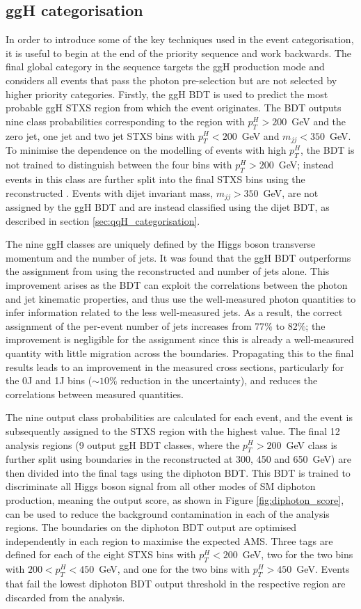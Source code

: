 \FloatBarrier
\newpage
\subsection{ggH categorisation}
In order to introduce some of the key techniques used in the event categorisation, it is useful to begin at the end of the priority sequence and work backwards. The final global category in the sequence targets the ggH production mode and considers all events that pass the photon pre-selection but are not selected by higher priority categories. Firstly, the ggH BDT is used to predict the most probable ggH STXS region from which the event originates. The BDT outputs nine class probabilities corresponding to the region with $p_T^H>200$~GeV and the zero jet, one jet and two jet STXS bins with $p_T^H<200$~GeV and $m_{jj}<350$~GeV. To minimise the dependence on the modelling of events with high $p_T^H$, the BDT is not trained to distinguish between the four bins with $p_T^H>200$~GeV; instead events in this class are further split into the final STXS bins using the reconstructed \ptgg. Events with dijet invariant mass, $m_{jj}>350$~GeV, are not assigned by the ggH BDT and are instead classified using the dijet BDT, as described in section \ref{sec:qqH_categorisation}.

The nine ggH classes are uniquely defined by the Higgs boson transverse momentum and the number of jets. It was found that the ggH BDT outperforms the assignment from using the reconstructed \ptgg and number of jets alone. This improvement arises as the BDT can exploit the correlations between the photon and jet kinematic properties, and thus use the well-measured photon quantities to infer information related to the less well-measured jets. As a result, the correct assignment of the per-event number of jets increases from 77\% to 82\%; the improvement is negligible for the \ptgg assignment since this is already a well-measured quantity with little migration across the \ptH boundaries. Propagating this to the final results leads to an improvement in the measured cross sections, particularly for the 0J and 1J bins ($\sim 10\%$ reduction in the uncertainty), and reduces the correlations between measured quantities.

The nine output class probabilities are calculated for each event, and the event is subsequently assigned to the STXS region with the highest value. The final 12 analysis regions (9 output ggH BDT classes, where the $p_T^H>200$~GeV class is further split using boundaries in the reconstructed \ptgg at 300, 450 and 650~GeV) are then divided into the final tags using the diphoton BDT. This BDT is trained to discriminate all Higgs boson signal from all other modes of SM diphoton production, meaning the output score, as shown in Figure \ref{fig:diphoton_score}, can be used to reduce the background contamination in each of the analysis regions. The boundaries on the diphoton BDT output are optimised independently in each region to maximise the expected AMS. Three tags are defined for each of the eight STXS bins with $p_T^H<200$~GeV, two for the two bins with ${200<p_T^H<450}$~GeV, and one for the two bins with $p_T^H>450$~GeV. Events that fail the lowest diphoton BDT output threshold in the respective region are discarded from the analysis. 

